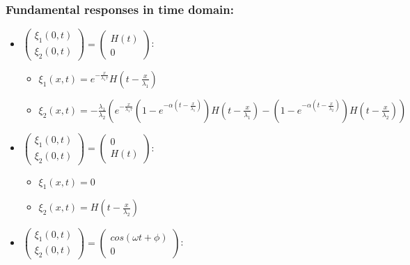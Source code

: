 \documentclass[preprint]{elsarticle}
\begin{document}
\subsubsection{Fundamental responses in time domain:}
\begin{itemize}
\item $\left(\begin{array}{c}
\xi_{1}\left(0,t\right)\\
\xi_{2}\left(0,t\right)
\end{array}\right)=\left(\begin{array}{c}
H\left(t\right)\\
0
\end{array}\right)$:

\begin{itemize}
\item $\xi_{1}\left(x,t\right)=e^{-\frac{x}{\lambda_{1}\tau}}H\left(t-\frac{x}{\lambda_{1}}\right)$
\item $\xi_{2}\left(x,t\right)=-\frac{\lambda_{1}}{\lambda_{2}}\left(e^{-\frac{x}{\lambda_{1}\tau}}\left(1-e^{-\alpha\left(t-\frac{x}{\lambda_{1}}\right)}\right)H\left(t-\frac{x}{\lambda_{1}}\right)-\left(1-e^{-\alpha\left(t-\frac{x}{\lambda_{2}}\right)}\right)H\left(t-\frac{x}{\lambda_{2}}\right)\right)$
\end{itemize}
\item $\left(\begin{array}{c}
\xi_{1}\left(0,t\right)\\
\xi_{2}\left(0,t\right)
\end{array}\right)=\left(\begin{array}{c}
0\\
H\left(t\right)
\end{array}\right)$:

\begin{itemize}
\item $\xi_{1}\left(x,t\right)=0$
\item $\xi_{2}\left(x,t\right)=H\left(t-\frac{x}{\lambda_{2}}\right)$
\end{itemize}
\item $\left(\begin{array}{c}
\xi_{1}\left(0,t\right)\\
\xi_{2}\left(0,t\right)
\end{array}\right)=\left(\begin{array}{c}
cos\left(\omega t+\phi\right)\\
0
\end{array}\right)$:


\end{itemize}
\end{document}
